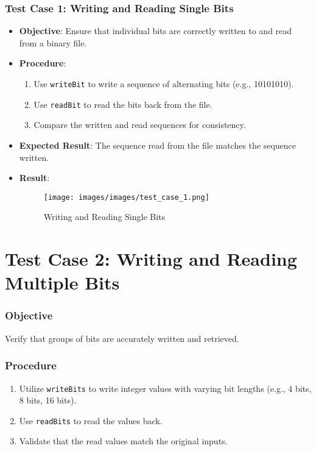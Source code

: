 \documentclass[11pt,twoside,a4paper]{report}
\begin{document}
\subsubsection{Test Case 1: Writing and Reading Single Bits}
\begin{itemize}
    \item \textbf{Objective}: Ensure that individual bits are correctly written to and read from a binary file.
    \item \textbf{Procedure}:
    \begin{enumerate}
        \item Use \texttt{writeBit} to write a sequence of alternating bits (e.g., 10101010).
        \item Use \texttt{readBit} to read the bits back from the file.
        \item Compare the written and read sequences for consistency.
    \end{enumerate}
    \item \textbf{Expected Result}: The sequence read from the file matches the sequence written.
    \item \textbf{Result}: 
    \begin{figure}[h]
        \centering
        \texttt{[image: images/images/test\_case\_1.png]}
        \caption{Writing and Reading Single Bits}
        \label{fig:test_case_1}
    \end{figure}
\end{itemize}

\section{Test Case 2: Writing and Reading Multiple Bits}

\subsubsection{Objective}
Verify that groups of bits are accurately written and retrieved.

\subsubsection{Procedure}
\begin{enumerate}
    \item Utilize \texttt{writeBits} to write integer values with varying bit lengths (e.g., 4 bits, 8 bits, 16 bits).
    \item Use \texttt{readBits} to read the values back.
    \item Validate that the read values match the original inputs.
\end{enumerate}
\end{document}
